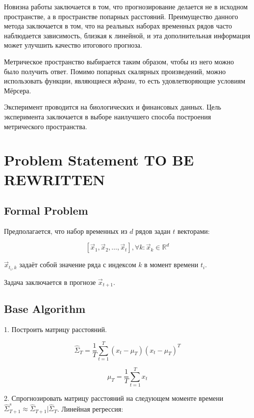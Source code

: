 \documentclass{article}
\begin{document}
	Новизна работы заключается в том, что прогнозирование делается не в исходном пространстве, а в пространстве попарных расстояний. Преимущество данного метода заключается в том, что на реальных наборах временных рядов часто наблюдается зависимость, близкая к линейной, и эта дополнительная информация может улучшить качество итогового прогноза.
	
	Метрическое пространство выбирается таким образом, чтобы из него можно было получить ответ. Помимо попарных скалярных произведений, можно использовать функции, являющиеся \textit{ядрами}, то есть удовлетворяющие условиям Мёрсера.
	
	Эксперимент проводится на биологических и финансовых данных. Цель эксперимента заключается в выборе наилучшего способа построения метрического пространства.

\section{Problem Statement TO BE REWRITTEN}

\subsection{Formal Problem}

Предполагается, что набор временных из $d$ рядов задан $t$ векторами:

$$[\vec{x}_1, \vec{x}_2, \ldots, \vec{x}_t], \forall k: \vec{x}_k \in \mathbb{R}^d $$

$\vec{x}_{t_i, k}$ задаёт собой значение ряда с индексом $k$ в момент времени $t_i$.

Задача заключается в прогнозе $\vec{x}_{t+1}$.

\subsection{Base Algorithm}

1. Построить матрицу расстояний.

\begin{equation}
	\hat{\Sigma}_T = \frac{1}{T} \sum_{t=1}^{T} (x_t - \mu_T)(x_t - \mu_T)^T
\end{equation}

\begin{equation}
	\mu_T = \frac{1}{T} \sum_{t=1}^{T} x_t
\end{equation}

2. Спрогнозировать матрицу расстояний на следующем моменте времени $\hat{\Sigma}_{T+1}^s \approx \hat{\Sigma}_{T+1} | \hat{\Sigma}_{T}$. Линейная регрессия:
\end{document}
